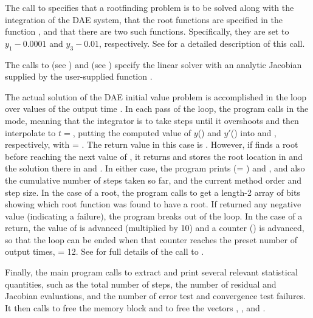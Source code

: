 The call to  specifies that a rootfinding problem
is to be solved along with the integration of the DAE system, that the
root functions are specified in the function , and that there are
two such functions.  Specifically, they are set to $y_1 - 0.0001$ and 
$y_3 - 0.01$, respectively.
See  for a detailed description of this call.

The calls to  (see ) and 
 (see ) specify the {\idadense}
linear solver with an analytic Jacobian supplied by the user-supplied function
.

The actual solution of the DAE initial value problem is accomplished in
the loop over values of the output time .  In each pass of the
loop, the program calls  in the  mode, meaning
that the integrator is to take steps until it overshoots  and then
interpolate to $t =  $, putting the computed value of $y$()
and $y'$() into  and , respectively, with
 = .  The return value in this case is .
However, if  finds a root before reaching the next value
of , it returns  and stores the root
location in  and the solution there in  and .  In
either case, the program prints  (= ) and , and
also the cumulative number of steps taken so far, and the current
method order and step size.
In the case of a root, the program calls  to get a
length-2 array  of bits showing which root function was
found to have a root.  If  returned any negative value
(indicating a failure), the program breaks out of the loop.  In the
case of a  return, the value of  is advanced
(multiplied by 10) and a counter () is advanced, so that the
loop can be ended when that counter reaches the preset number of
output times,  = 12.  See  for full
details of the call to .

Finally, the main program calls  to extract and
print several relevant statistical quantities, such as the total
number of steps, the number of residual and Jacobian evaluations, and
the number of error test and convergence test failures.  It then calls
 to free the {\ida} memory block and 
to free the vectors , , and .

